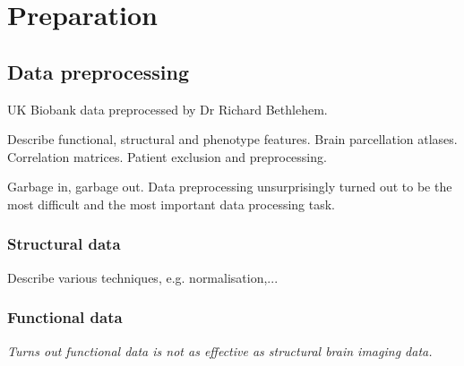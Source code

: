 \chapter{Preparation}

\section{Data preprocessing}
UK Biobank data preprocessed by Dr Richard Bethlehem.

Describe functional, structural and phenotype features. Brain parcellation atlases. Correlation matrices. Patient exclusion and preprocessing.

Garbage in, garbage out. Data preprocessing unsurprisingly turned out to be the most difficult and the most important data processing task.

\subsection{Structural data}
Describe various techniques, e.g. normalisation,...

\subsection{Functional data}
\textit{Turns out functional data is not as effective as structural brain imaging data.}

